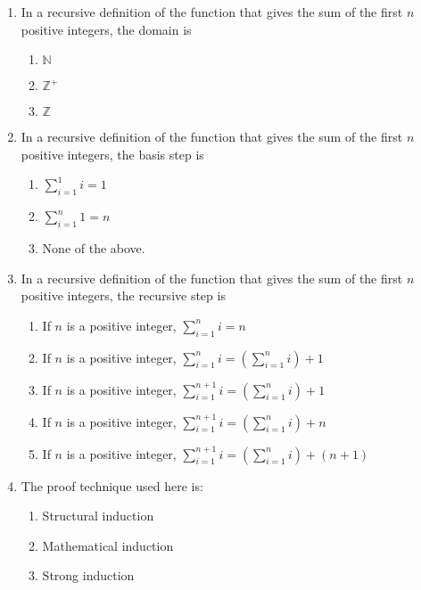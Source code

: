 \begin{enumerate}
   \item In a recursive definition of the function that gives the sum of the first $n$ positive integers, the domain is 
    \begin{enumerate}
        \item $\mathbb{N}$
        \item $\mathbb{Z}^+$
        \item $\mathbb{Z}$
    \end{enumerate}

   \item In a recursive definition of the function that gives the sum of the first $n$ positive integers, the basis step is
    \begin{enumerate}
        \item $\sum_{i=1}^1 i = 1$
        \item $\sum_{i=1}^n 1 = n$
        \item None of the above.
    \end{enumerate}

   \item In a recursive definition of the function that gives the sum of the first $n$ positive integers, the recursive step is
    \begin{enumerate}
        \item If $n$ is a positive integer, $\sum_{i=1}^n i = n$
        \item If $n$ is a positive integer, $\sum_{i=1}^n i =\left(  \sum_{i=1}^n i \right)+ 1$
        \item If $n$ is a positive integer, $\sum_{i=1}^{n+1} i =\left(  \sum_{i=1}^n i \right) + 1$
        \item If $n$ is a positive integer, $\sum_{i=1}^{n+1} i =\left(  \sum_{i=1}^n i \right) + n$
        \item If $n$ is a positive integer, $\sum_{i=1}^{n+1} i =\left(  \sum_{i=1}^n i \right)+ (n+1)$
    \end{enumerate}

    \item The proof technique used here is:
    \begin{enumerate}
        \item Structural induction
        \item Mathematical induction
        \item Strong induction
    \end{enumerate}
    

\end{enumerate}
